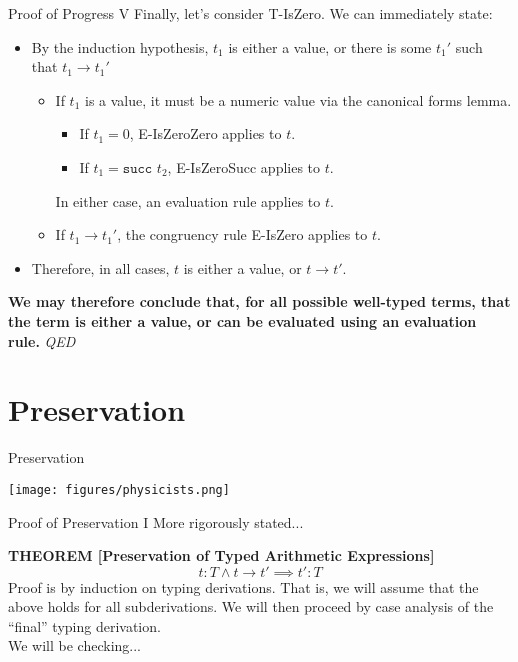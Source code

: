 \documentclass[11pt]{beamer}
\begin{document}
\begin{frame}[fragile=singleslide]{Proof of Progress V}
Finally, let's consider T-IsZero.  We can immediately state:
\begin{itemize}
\item By the induction hypothesis, $t_1$ is either a value, or there is some $t_1'$ such that $t_1 \rightarrow t_1'$
\begin{itemize}
\item If $t_1$ is a value, it must be a numeric value via the canonical forms lemma.  
\begin{itemize}
\item If $t_1 = 0$, E-IsZeroZero applies to $t$.
\item If $t_1 = \texttt{succ } t_2$, E-IsZeroSucc applies to $t$.
\end{itemize}
In either case, an evaluation rule applies to $t$.
\item If $t_1 \rightarrow t_1'$, the congruency rule E-IsZero applies to $t$.
\end{itemize}
\item Therefore, in all cases, $t$ is either a value, or $t \rightarrow t'$.
\end{itemize}

\textbf{We may therefore conclude that, for all possible well-typed terms, that the term is either a value, or can be evaluated using an evaluation rule.} \emph{QED}
\end{frame}

\section[Preservation]{Preservation}
\begin{frame}[fragile=singleslide]{Preservation}
\begin{center}
\texttt{[image: figures/physicists.png]}
\end{center}
\end{frame}

\begin{frame}[fragile=singleslide]{Proof of Preservation I}
More rigorously stated... 

\textbf{THEOREM [Preservation of Typed Arithmetic Expressions]}
\begin{equation}
t : T \land t \rightarrow t' \implies t' : T
\end{equation}
Proof is by induction on typing derivations.  That is, we will assume that the above holds for all subderivations.  We will then proceed by case analysis of the ``final'' typing derivation.  \\ 
\vspace{1em}
We will be checking... 

\end{frame}
\end{document}

